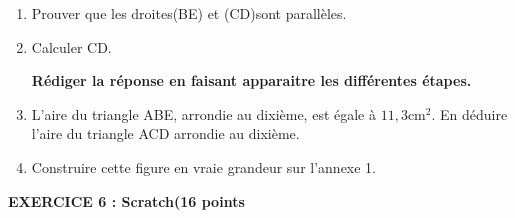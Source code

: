 \documentclass[11pt]{article}
\begin{document}
\medskip

\begin{enumerate}
\item Prouver que les droites(BE) et (CD)sont parallèles. 
\item Calculer CD.

\textbf{Rédiger la réponse en faisant apparaitre les différentes étapes.}
\item L'aire du triangle ABE, arrondie au dixième, est égale à $11,3$cm$^2$.
En déduire l'aire du triangle ACD arrondie au dixième.
\item Construire cette figure en vraie grandeur sur l'annexe 1.
\end{enumerate}

\bigskip

\textbf{EXERCICE 6 : Scratch\hfill (16 points}

\medskip
\end{document}
